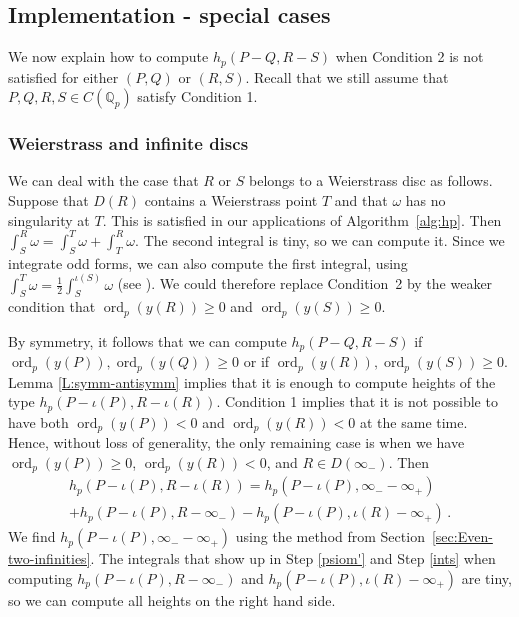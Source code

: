 \documentclass[11pt, a4paper]{amsart}
\newcommand{\Q}{\mathbb{Q}}
\newcommand{\ord}{\operatorname{ord}}
\theoremstyle{remark}
\numberwithin{equation}{section}
\newcommand{\sg}{{}}
\begin{document}
\subsection{Implementation - special cases}\label{subsec:implementation_special_cases}

\sg{We now explain how to compute $h_p(P-Q, R-S)$ when Condition 2 is not
satisfied for either $(P,Q)$ or $(R,S)$}. Recall that we still assume that $P,Q,R,S\in C(\Q_p)$ satisfy Condition 1.

\subsubsection{Weierstrass and infinite discs}\label{subsec:weierstrass}
We can deal with the case that $R$ or $S$ belongs to a Weierstrass disc as
follows. Suppose that $D(R)$ contains a Weierstrass point $T$ and that
$\omega$ has no singularity at $T$. This is satisfied in our applications of Algorithm~\ref{alg:hp}.
Then
$\int_S^R \omega= \int_S^T \omega + \int_T^R \omega$. The second integral is tiny,
   so we can compute it. Since we integrate odd forms, we can also compute the first integral, using $\int_S^T \omega=\frac{1}{2}\int_S^{\iota(S)} \omega$ (see \cite[Lemma 16]{BBK}). 
 We could therefore replace 
  Condition~2 by the weaker condition that
   $\ord_p(y(R))\geq 0$ and $\ord_p(y(S))\geq 0$.

By symmetry, it follows that we can compute $h_p(P-Q,R-S)$ if
$\ord_p(y(P)),\ord_p(y(Q))\geq 0$ or if  $\ord_p(y(R)),\ord_p(y(S))\geq 0$.
Lemma \ref{L:symm-antisymm} implies that it is enough to compute heights of
the  type $h_p(P-\iota(P),R-\iota(R))$. Condition 1 implies that
it is not possible to have both $\ord_p(y(P))<0$ and $ \ord_p(y(R)) <0$ at
the same time. Hence, without loss of generality, the only remaining case
is when we have $\ord_p(y(P))\ge 0$, $\ord_p(y(R)) <0$, and $R\in D(\infty_-)$. Then
\begin{multline*}
h_p(P-\iota(P),R-\iota(R))=h_p(P-\iota(P),\infty_- - \infty_+)\\ +
  h_p(P-\iota(P), R - \infty_-) -  h_p(P-\iota(P), \iota(R) - \infty_+)\,.
\end{multline*}
We find $h_p(P-\iota(P),\infty_- - \infty_+)$ using the method from
Section~\ref{sec:Even-two-infinities}. The integrals that show up in Step
\eqref{psiom'} and Step \eqref{ints} when computing $h_p(P-\iota(P), R -  \infty_-)$ and $h_p(P-\iota(P), \iota(R) - \infty_+)$ are tiny, so we can  compute all heights on the right hand side.
\end{document}
